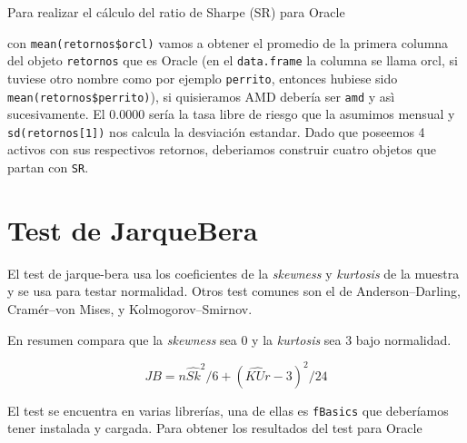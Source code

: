 \documentclass[12pt,]{book}
\newenvironment{Shaded}{\begin{snugshade}}{\end{snugshade}}
\newcommand{\KeywordTok}[1]{\textcolor[rgb]{0.13,0.29,0.53}{\textbf{#1}}}
\newcommand{\FloatTok}[1]{\textcolor[rgb]{0.00,0.00,0.81}{#1}}
\newcommand{\StringTok}[1]{\textcolor[rgb]{0.31,0.60,0.02}{#1}}
\newcommand{\OperatorTok}[1]{\textcolor[rgb]{0.81,0.36,0.00}{\textbf{#1}}}
\newcommand{\NormalTok}[1]{#1}
\begin{document}
Para realizar el cálculo del ratio de Sharpe (SR) para Oracle

\begin{Shaded}
\end{Shaded}

con \texttt{mean(retornos\$orcl)} vamos a obtener el promedio de la
primera columna del objeto \texttt{retornos} que es Oracle (en el
\texttt{data.frame} la columna se llama orcl, si tuviese otro nombre
como por ejemplo \texttt{perrito}, entonces hubiese sido
\texttt{mean(retornos\$perrito)}), si quisieramos AMD debería ser
\texttt{amd} y asì sucesivamente. El 0.0000 sería la tasa libre de
riesgo que la asumimos mensual y \texttt{sd(retornos{[}1{]})} nos
calcula la desviación estandar. Dado que poseemos 4 activos con sus
respectivos retornos, deberiamos construir cuatro objetos que partan con
\texttt{SR}.

\section{Test de JarqueBera}\label{test-de-jarquebera}

El test de jarque-bera usa los coeficientes de la \emph{skewness} y
\emph{kurtosis} de la muestra y se usa para testar normalidad. Otros
test comunes son el de Anderson--Darling, Cramér--von Mises, y
Kolmogorov--Smirnov.

En resumen compara que la \emph{skewness} sea 0 y la \emph{kurtosis} sea
3 bajo normalidad.

\[
JB = n{\widehat{Sk}^2 /6 + (\widehat{KUr} - 3)^2 /24}
\]

El test se encuentra en varias librerías, una de ellas es
\texttt{fBasics} que deberíamos tener instalada y cargada. Para obtener
los resultados del test para Oracle

\begin{Shaded}
\end{Shaded}
\end{document}
